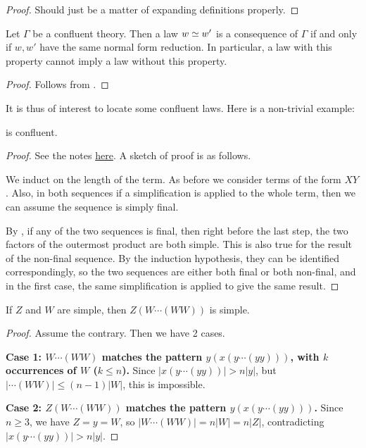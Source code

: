 \begin{proof}  Should just be a matter of expanding definitions properly.
\end{proof}

\begin{corollary}\label{confluent-anti-impl}  Let $\Gamma$ be a confluent theory.  Then a law $w \simeq w'$ is a consequence of $\Gamma$ if and only if $w,w'$ have the same normal form reduction.  In particular, a law with this property cannot imply a law without this property.
\end{corollary}

\begin{proof}  Follows from .
\end{proof}

It is thus of interest to locate some confluent laws.  Here is a non-trivial example:

\begin{theorem}[477 confluent]\label{477-confl}  is confluent.
\end{theorem}

\begin{proof} See the notes \href{https://www.overleaf.com/project/66f847bb14d0d8f0b77f74e1}{here}. A sketch of proof is as follows.

  We induct on the length of the term.
As before we consider terms of the form $XY$.
Also, in both sequences if a simplification is applied to the whole term, then we can assume the sequence is simply final.

By , if any of the two sequences is final,
then right before the last step, the two factors of the outermost product are both simple. This is also true for the result of the non-final sequence. By the induction hypothesis, they can be identified correspondingly, so the two sequences are either both final or both non-final, and in the first case, the same simplification is applied to give the same result.
\end{proof}

\begin{lemma}[477 lemma]\label{477-lemma}
    If $Z$ and $W$ are simple, then $Z(W\cdots(WW))$ is simple.
\end{lemma}

\begin{proof}
    Assume the contrary. Then we have 2 cases.

    \textbf{Case 1: $W\cdots(WW)$ matches the pattern
    $y(x(y\cdots(yy)))$, with $k$ occurrences of $W$ ($k \le n$).}
    Since $|x(y\cdots(yy))| > n|y|$, but $|\cdots(WW)| \le (n-1)|W|$, this is impossible.

    \textbf{Case 2: $Z(W\cdots(WW))$ matches the pattern
    $y(x(y\cdots(yy)))$.} Since $n \ge 3$, we have $Z = y = W$,
    so $|W\cdots(WW)| = n|W| = n|Z|$,
    contradicting $|x(y\cdots(yy))| > n|y|$.
\end{proof}
